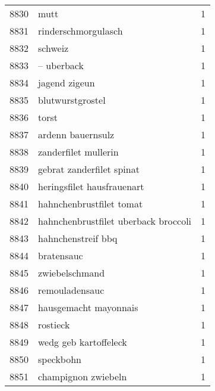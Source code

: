 \begin{tabular}{llr}
8830 &                                               mutt &      1 \\
8831 &                                rinderschmorgulasch &      1 \\
8832 &                                            schweiz &      1 \\
8833 &                                         – uberback &      1 \\
8834 &                                      jagend zigeun &      1 \\
8835 &                                   blutwurstgrostel &      1 \\
8836 &                                              torst &      1 \\
8837 &                                  ardenn bauernsulz &      1 \\
8838 &                               zanderfilet mullerin &      1 \\
8839 &                          gebrat zanderfilet spinat &      1 \\
8840 &                         heringsfilet hausfrauenart &      1 \\
8841 &                           hahnchenbrustfilet tomat &      1 \\
8842 &               hahnchenbrustfilet uberback broccoli &      1 \\
8843 &                                 hahnchenstreif bbq &      1 \\
8844 &                                         bratensauc &      1 \\
8845 &                                     zwiebelschmand &      1 \\
8846 &                                     remouladensauc &      1 \\
8847 &                              hausgemacht mayonnais &      1 \\
8848 &                                           rostieck &      1 \\
8849 &                              wedg geb kartoffeleck &      1 \\
8850 &                                          speckbohn &      1 \\
8851 &                                champignon zwiebeln &      1 \\
\bottomrule
\end{tabular}
